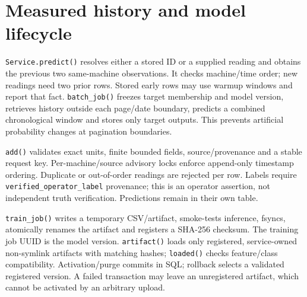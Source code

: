 \section{Measured history and model lifecycle}
\begin{center}\end{center}
\texttt{Service.predict()} resolves either a stored ID or a supplied reading and obtains the previous two same-machine observations. It checks machine/time order; new readings need two prior rows. Stored early rows may use warmup windows and report that fact. \texttt{batch\_job()} freezes target membership and model version, retrieves history outside each page/date boundary, predicts a combined chronological window and stores only target outputs. This prevents artificial probability changes at pagination boundaries.

\texttt{add()} validates exact units, finite bounded fields, source/provenance and a stable request key. Per-machine/source advisory locks enforce append-only timestamp ordering. Duplicate or out-of-order readings are rejected per row. Labels require \texttt{verified\_operator\_label} provenance; this is an operator assertion, not independent truth verification. Predictions remain in their own table.

\texttt{train\_job()} writes a temporary CSV/artifact, smoke-tests inference, fsyncs, atomically renames the artifact and registers a SHA-256 checksum. The training job UUID is the model version. \texttt{artifact()} loads only registered, service-owned non-symlink artifacts with matching hashes; \texttt{loaded()} checks feature/class compatibility. Activation/purge commits in SQL; rollback selects a validated registered version. A failed transaction may leave an unregistered artifact, which cannot be activated by an arbitrary upload.
